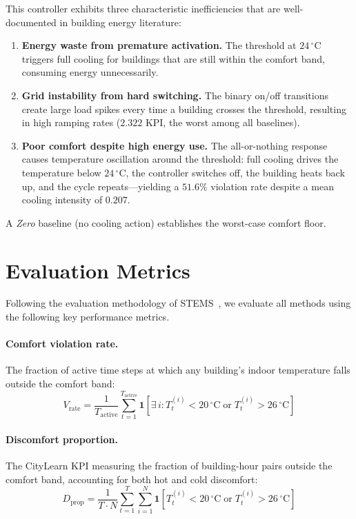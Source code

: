 This controller exhibits three characteristic inefficiencies that are
well-documented in building energy literature:
\begin{enumerate}
  \item \textbf{Energy waste from premature activation.}  The threshold at
    $24\,^\circ$C triggers full cooling for buildings that are still within the
    comfort band, consuming energy unnecessarily.
  \item \textbf{Grid instability from hard switching.}  The binary on/off
    transitions create large load spikes every time a building crosses the
    threshold, resulting in high ramping rates ($2.322$ KPI, the worst among
    all baselines).
  \item \textbf{Poor comfort despite high energy use.}  The all-or-nothing
    response causes temperature oscillation around the threshold: full cooling
    drives the temperature below $24\,^\circ$C, the controller switches off,
    the building heats back up, and the cycle repeats---yielding a $51.6\%$
    violation rate despite a mean cooling intensity of $0.207$.
\end{enumerate}

A \emph{Zero} baseline (no cooling action) establishes the worst-case comfort
floor.


\section{Evaluation Metrics}
\label{sec:temp-metrics}

Following the evaluation methodology of STEMS~\cite{zhang2025stems}, we
evaluate all methods using the following key performance metrics.

\paragraph{Comfort violation rate.}
The fraction of active time steps at which any building's indoor temperature
falls outside the comfort band:
\begin{equation}
  V_{\text{rate}} = \frac{1}{T_{\text{active}}}
    \sum_{t=1}^{T_{\text{active}}} \mathbf{1}\!\left[
      \exists\, i : T_t^{(i)} < 20\,^\circ\text{C}
      \;\text{or}\; T_t^{(i)} > 26\,^\circ\text{C}
    \right]
  \label{eq:violation-rate}
\end{equation}

\paragraph{Discomfort proportion.}
The CityLearn KPI measuring the fraction of building-hour pairs outside the
comfort band, accounting for both hot and cold discomfort:
\begin{equation}
  D_{\text{prop}} = \frac{1}{T \cdot N}
    \sum_{t=1}^{T} \sum_{i=1}^{N}
    \mathbf{1}\!\left[T_{t}^{(i)} < 20\,^\circ\text{C}
      \;\text{or}\; T_{t}^{(i)} > 26\,^\circ\text{C}\right]
  \label{eq:discomfort-proportion}
\end{equation}

